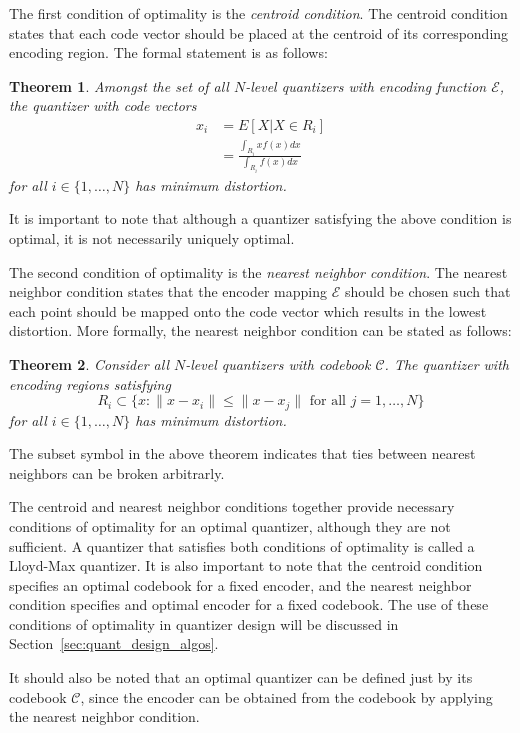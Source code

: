 \documentclass[10pt]{article}
\newtheorem{theorem}{Theorem}[section]
\begin{document}
The first condition of optimality is the \emph{centroid condition}. The centroid condition states that each code vector should be placed at the centroid of its corresponding encoding region. The formal statement is as follows:
\begin{theorem}
\label{theo:cent_vq}
Amongst the set of all $N$-level quantizers with encoding function $\mathcal{E}$, the quantizer with code vectors
\begin{align}
  \label{eq:cent_vq}
x_i &= E[X | X \in R_i] \\
&= \frac{ \int_{R_i}xf(x)dx }{ \int_{R_i}f(x)dx }
\end{align}
for all $i \in \{1,\ldots,N\}$ has minimum distortion.
\end{theorem}
It is important to note that although a quantizer satisfying the above condition is optimal, it is not necessarily uniquely optimal.

The second condition of optimality is the \emph{nearest neighbor condition}. The nearest neighbor condition states that the encoder mapping $\mathcal{E}$ should be chosen such that each point should be mapped onto the code vector which results in the lowest distortion. More formally, the nearest neighbor condition can be stated as follows:
\begin{theorem}
Consider all $N$-level quantizers with codebook $\mathcal{C}$. The quantizer with encoding regions satisfying
\begin{equation}
R_i \subset \{x : \| x - x_i \| \le \| x - x_j \| \text{ for all } j = 1,\ldots,N \}
\end{equation}
for all $i \in \{1,\ldots,N\}$ has minimum distortion.
\end{theorem}
The subset symbol in the above theorem indicates that ties between nearest neighbors can be broken arbitrarly.

The centroid and nearest neighbor conditions together provide necessary conditions of optimality for an optimal quantizer, although they are not sufficient. A quantizer that satisfies both conditions of optimality is called a Lloyd-Max quantizer. It is also important to note that the centroid condition specifies an optimal codebook for a fixed encoder, and the nearest neighbor condition specifies and optimal encoder for a fixed codebook. The use of these conditions of optimality in quantizer design will be discussed in Section~\ref{sec:quant_design_algos}.

It should also be noted that an optimal quantizer can be defined just by its codebook $\mathcal{C}$, since the encoder can be obtained from the codebook by applying the nearest neighbor condition.
\end{document}
